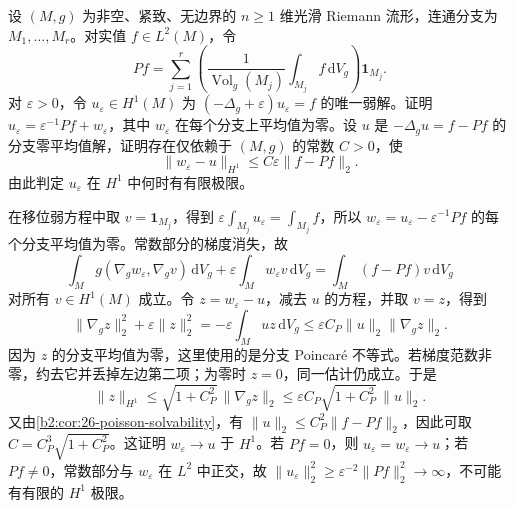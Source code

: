 \begin{exercise}
\label{b2:ex:26-vanishing-shift}
设 \((M,g)\) 为非空、紧致、无边界的 \(n\geq1\) 维光滑 Riemann 流形，连通分支为 \(M_1,\ldots,M_r\)。对实值 \(f\in L^2(M)\)，令
\[
 Pf=\sum_{j=1}^r\left(\frac1{\operatorname{Vol}_g(M_j)}
             \int_{M_j}f\,\mathrm dV_g\right)\mathbf1_{M_j}.
\]
对 \(\varepsilon>0\)，令 \(u_\varepsilon\in H^1(M)\) 为
\((-\Delta_g+\varepsilon)u_\varepsilon=f\) 的唯一弱解。证明
\(u_\varepsilon=\varepsilon^{-1}Pf+w_\varepsilon\)，其中 \(w_\varepsilon\) 在每个分支上平均值为零。设 \(u\) 是 \(-\Delta_gu=f-Pf\) 的分支零平均值解，证明存在仅依赖于 \((M,g)\) 的常数 \(C>0\)，使
\[
 \|w_\varepsilon-u\|_{H^1}
 \leq C\varepsilon\|f-Pf\|_2.
\]
由此判定 \(u_\varepsilon\) 在 \(H^1\) 中何时有有限极限。
\end{exercise}
\begin{solution}
在移位弱方程中取 \(v=\mathbf1_{M_j}\)，得到
\(\varepsilon\int_{M_j}u_\varepsilon=\int_{M_j}f\)，所以
\(w_\varepsilon=u_\varepsilon-\varepsilon^{-1}Pf\) 的每个分支平均值为零。常数部分的梯度消失，故
\[
 \int_Mg(\nabla_gw_\varepsilon,\nabla_gv)\,\mathrm dV_g
  +\varepsilon\int_Mw_\varepsilon v\,\mathrm dV_g
 =\int_M(f-Pf)v\,\mathrm dV_g
\]
对所有 \(v\in H^1(M)\) 成立。令 \(z=w_\varepsilon-u\)，减去 \(u\) 的方程，并取 \(v=z\)，得到
\[
 \|\nabla_gz\|_2^2+\varepsilon\|z\|_2^2
 =-\varepsilon\int_Muz\,\mathrm dV_g
 \leq\varepsilon C_P\|u\|_2\|\nabla_gz\|_2.
\]
因为 \(z\) 的分支平均值为零，这里使用的是分支 Poincaré 不等式。若梯度范数非零，约去它并丢掉左边第二项；为零时 \(z=0\)，同一估计仍成立。于是
\[
 \|z\|_{H^1}
 \leq\sqrt{1+C_P^2}\,\|\nabla_gz\|_2
 \leq\varepsilon C_P\sqrt{1+C_P^2}\,\|u\|_2.
\]
又由\cref{b2:cor:26-poisson-solvability}，有
\(\|u\|_2\leq C_P^2\|f-Pf\|_2\)，因此可取
\(C=C_P^3\sqrt{1+C_P^2}\)。这证明 \(w_\varepsilon\to u\) 于 \(H^1\)。若 \(Pf=0\)，则 \(u_\varepsilon=w_\varepsilon\to u\)；若 \(Pf\ne0\)，常数部分与 \(w_\varepsilon\) 在 \(L^2\) 中正交，故
\(\|u_\varepsilon\|_2^2\geq\varepsilon^{-2}\|Pf\|_2^2\to\infty\)，不可能有有限的 \(H^1\) 极限。
\end{solution}

